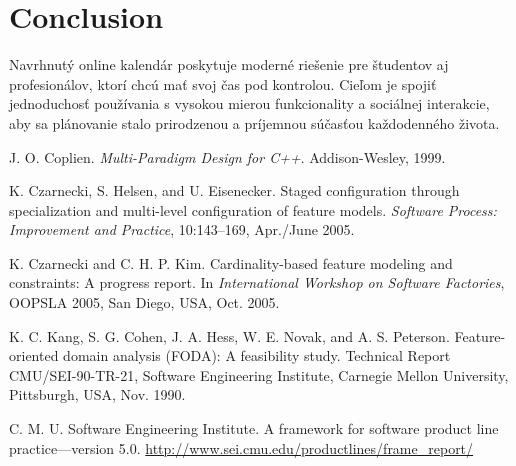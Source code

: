 \documentclass[a4paper,12pt]{article}
\begin{document}
\section{Conclusion}
Navrhnutý online kalendár poskytuje moderné riešenie pre študentov aj profesionálov, ktorí chcú mať svoj čas pod kontrolou.  
Cieľom je spojiť jednoduchosť používania s vysokou mierou funkcionality a sociálnej interakcie, aby sa plánovanie stalo prirodzenou a príjemnou súčasťou každodenného života.

\newpage
\begin{thebibliography}{9}
J. O. Coplien. \textit{Multi-Paradigm Design for C++}. Addison-Wesley, 1999.

K. Czarnecki, S. Helsen, and U. Eisenecker.
Staged configuration through specialization and multi-level configuration of feature models.
\textit{Software Process: Improvement and Practice}, 10:143–169, Apr./June 2005.

K. Czarnecki and C. H. P. Kim.
Cardinality-based feature modeling and constraints: A progress report.
In \textit{International Workshop on Software Factories}, OOPSLA 2005, San Diego, USA, Oct. 2005.

K. C. Kang, S. G. Cohen, J. A. Hess, W. E. Novak, and A. S. Peterson.
Feature-oriented domain analysis (FODA): A feasibility study.
Technical Report CMU/SEI-90-TR-21, Software Engineering Institute,
Carnegie Mellon University, Pittsburgh, USA, Nov. 1990.

C. M. U. Software Engineering Institute.
A framework for software product line practice—version 5.0.
\url{http://www.sei.cmu.edu/productlines/frame_report/}
\end{thebibliography}
\end{document}
